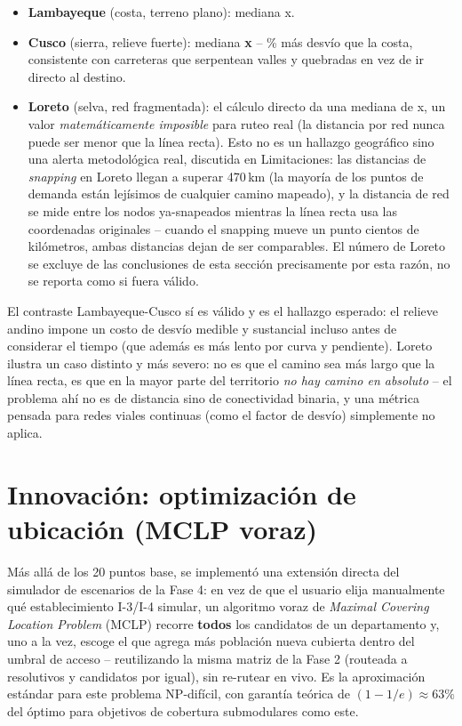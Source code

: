 \documentclass[11pt]{article}
\begin{document}
\begin{itemize}
  \item \textbf{Lambayeque} (costa, terreno plano): mediana \statDetourLambayeque x.
  \item \textbf{Cusco} (sierra, relieve fuerte): mediana \textbf{\statDetourCusco x} --
  \statDetourAndeanVsCoastalPct\% más desvío que la costa, consistente con
  carreteras que serpentean valles y quebradas en vez de ir directo al
  destino.
  \item \textbf{Loreto} (selva, red fragmentada): el cálculo directo da
  una mediana de \statDetourLoreto x, un valor \emph{matemáticamente imposible} para
  ruteo real (la distancia por red nunca puede ser menor que la línea
  recta). Esto no es un hallazgo geográfico sino una alerta metodológica
  real, discutida en Limitaciones: las distancias de \emph{snapping} en
  Loreto llegan a superar 470\,km (la mayoría de los puntos de demanda
  están lejísimos de cualquier camino mapeado), y la distancia de red se
  mide entre los nodos ya-snapeados mientras la línea recta usa las
  coordenadas originales -- cuando el snapping mueve un punto cientos de
  kilómetros, ambas distancias dejan de ser comparables. El número de
  Loreto se excluye de las conclusiones de esta sección precisamente por
  esta razón, no se reporta como si fuera válido.
\end{itemize}

El contraste Lambayeque-Cusco sí es válido y es el hallazgo esperado: el
relieve andino impone un costo de desvío medible y sustancial incluso
antes de considerar el tiempo (que además es más lento por curva y
pendiente). Loreto ilustra un caso distinto y más severo: no es que el
camino sea más largo que la línea recta, es que en la mayor parte del
territorio \emph{no hay camino en absoluto} -- el problema ahí no es de
distancia sino de conectividad binaria, y una métrica pensada para redes
viales continuas (como el factor de desvío) simplemente no aplica.

\section{Innovación: optimización de ubicación (MCLP voraz)}

Más allá de los 20 puntos base, se implementó una extensión directa del
simulador de escenarios de la Fase 4: en vez de que el usuario elija
manualmente qué establecimiento I-3/I-4 simular, un algoritmo voraz de
\emph{Maximal Covering Location Problem} (MCLP) recorre \textbf{todos} los
candidatos de un departamento y, uno a la vez, escoge el que agrega más
población nueva cubierta dentro del umbral de acceso -- reutilizando la
misma matriz de la Fase 2 (routeada a resolutivos y candidatos por igual),
sin re-rutear en vivo. Es la aproximación estándar para este problema
NP-difícil, con garantía teórica de $(1-1/e) \approx 63\%$ del óptimo para
objetivos de cobertura submodulares como este.
\end{document}
